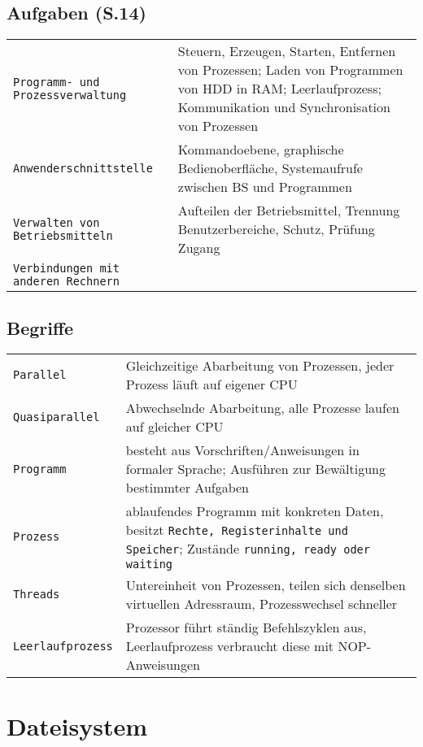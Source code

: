 \begin{multicols}{3}
\subsection{Aufgaben (S.14)}
\begin{tabular}{@{}p{\the\MyLen}%
		@{}p{\linewidth-\the\MyLen}@{}}
	\texttt{Programm- und Prozessverwaltung} & Steuern, Erzeugen, Starten, Entfernen von Prozessen; Laden von Programmen von HDD in RAM; Leerlaufprozess; Kommunikation und Synchronisation von Prozessen\\
	\texttt{Anwenderschnittstelle} & Kommandoebene, graphische Bedienoberfläche, Systemaufrufe zwischen BS und Programmen\\
	\texttt{Verwalten von Betriebsmitteln} & Aufteilen der Betriebsmittel, Trennung Benutzerbereiche, Schutz, Prüfung Zugang\\
	\texttt{Verbindungen mit anderen Rechnern} & \\
\end{tabular}

\subsection{Begriffe}
\begin{tabular}{@{}p{\the\MyLen}%
		@{}p{\linewidth-\the\MyLen}@{}}
	\texttt{Parallel} & Gleichzeitige Abarbeitung von Prozessen, jeder Prozess läuft auf eigener CPU\\
	\texttt{Quasiparallel} & Abwechselnde Abarbeitung, alle Prozesse laufen auf gleicher CPU\\
	\texttt{Programm} & besteht aus Vorschriften/Anweisungen in formaler Sprache; Ausführen zur Bewältigung bestimmter Aufgaben\\
	\texttt{Prozess} & ablaufendes Programm mit konkreten Daten, besitzt \texttt{Rechte, Registerinhalte und Speicher}; Zustände \texttt{running, ready oder waiting}\\
	\texttt{Threads} & Untereinheit von Prozessen, teilen sich denselben virtuellen Adressraum, Prozesswechsel schneller\\
	\texttt{Leerlaufprozess} & Prozessor führt ständig Befehlszyklen aus, Leerlaufprozess verbraucht diese mit NOP-Anweisungen\\
\end{tabular}

\section{Dateisystem}

\end{multicols}
